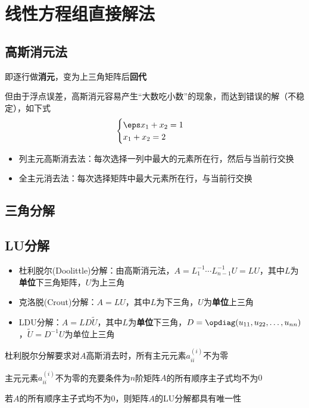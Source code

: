 
\section{线性方程组直接解法}
\subsection{高斯消元法}
即逐行做\textbf{消元}，变为上三角矩阵后\textbf{回代}

但由于浮点误差，高斯消元容易产生``大数吃小数''的现象，而达到错误的解（不稳定），如下式
\[\begin{cases}
    \eps x_1+x_2=1\\
    x_1+x_2=2
\end{cases}\]

\begin{itemize}
    \item 列主元高斯消去法：每次选择一列中最大的元素所在行，然后与当前行交换
    \item 全主元消去法：每次选择矩阵中最大元素所在行，与当前行交换
\end{itemize}

\subsection{三角分解}
\subsection{LU分解}
\begin{itemize}
\item 杜利脱尔(Doolittle)分解：由高斯消元法，$A=L_1^{-1}\cdots L_{n-1}^{-1}U=LU$，其中$L$为\textbf{单位}下三角矩阵，$U$为上三角
\item 克洛脱(Crout)分解：$A=LU$，其中$L$为下三角，$U$为\textbf{单位}上三角
\item LDU分解：$A=LD\tilde{U}$，其中$L$为\textbf{单位}下三角，$D=\opdiag(u_{11},u_{22},\ldots,u_{nn})$，$\tilde{U}=D^{-1}U$为单位上三角
\end{itemize}

杜利脱尔分解要求对$A$高斯消去时，所有主元元素$a_{ii}^{(i)}$不为零
\begin{theorem}
    主元元素$a_{ii}^{(i)}$不为零的充要条件为$n$阶矩阵$A$的所有顺序主子式均不为$0$
\end{theorem}
\begin{theorem}
    若$A$的所有顺序主子式均不为$0$，则矩阵$A$的LU分解都具有唯一性
\end{theorem}

